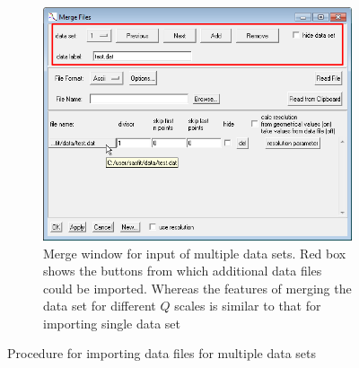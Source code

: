 \begin{figure}[htb]
\captionsetup[subfigure]{position=b}
\centering
{}
\hfill
{}
\hfill
\begin{subfigure}[b]{.7\textwidth}
   \centering
   \includegraphics[width=\textwidth]{QTloadingMultipleDS5.png}
   \caption{Merge window for input of multiple data sets. Red box shows the buttons
             from which additional data files could be imported.
             Whereas the features of merging the data set for different $Q$ scales
             is similar to that for importing single data set}
   \label{fig:QTloadingMultipleDS5}
\end{subfigure}
\caption{Procedure for importing data files for multiple data sets}
\label{fig:QTmergeMultipleDS2}
\end{figure}
